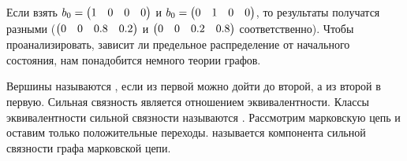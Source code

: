 \documentclass{article}
\begin{document}
\begin{itemize}
\begin{Comment}
\begin{figure}[H]
            \end{figure}\noindent
            Если взять $b_0=\left(\begin{matrix}1 & 0 & 0 & 0\end{matrix}\right)$ и $b_0=\left(\begin{matrix}0 & 1 & 0 & 0\end{matrix}\right)$, то результаты получатся разными ($\left(\begin{matrix}0 & 0 & 0.8 & 0.2\end{matrix}\right)$ и $\left(\begin{matrix}0 & 0 & 0.2 & 0.8\end{matrix}\right)$ соответственно). Чтобы проанализировать, зависит ли предельное распределение от начального состояния, нам понадобится немного теории графов.
        \end{Comment}
        \dfn Вершины называются , если из первой можно дойти до второй, а из второй в первую.
        \thm Сильная связность является отношением эквивалентности.
        \dfn Классы эквивалентности сильной связности называются .
        \dfn Рассмотрим марковскую цепь и оставим только положительные переходы.  называется компонента сильной связности графа марковской цепи.
        \begin{Example}
            \begin{figure}[H]
\end{figure}
\end{Example}
\end{itemize}
\end{document}
